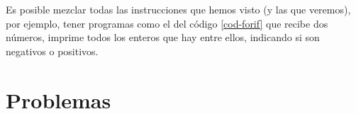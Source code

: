 Es posible mezclar todas las instrucciones que hemos visto (y las que veremos), por ejemplo, tener programas como el del código \ref{cod-forif} que recibe dos números, imprime todos los enteros que hay entre ellos, indicando si son negativos o positivos.






\section{Problemas}



\newpage